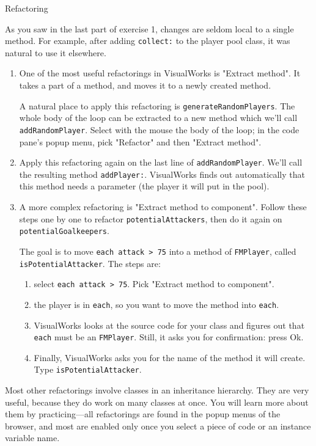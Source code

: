 \documentclass[a4paper,10pt]{scrartcl}
\begin{document}
\begin{exercise}{Refactoring}

As you saw in the last part of exercise 1, changes are seldom local
to a single method.  For example, after adding \verb!collect:! to the
player pool class, it was natural to use it elsewhere.

\begin{enumerate}
\item One of the most useful refactorings in VisualWorks is "Extract
  method".  It takes a part of a method, and moves it to a newly created
  method.

  A natural place to apply this refactoring is \verb!generateRandomPlayers!.
  The whole body of the loop can be extracted to a new method which we'll
  call \verb!addRandomPlayer!.  Select with the mouse the body of the loop;
  in the code pane's popup menu, pick "Refactor" and then "Extract method".

\item Apply this refactoring again on the last line of
  \verb!addRandomPlayer!.  We'll call the resulting method \verb!addPlayer:!.
  VisualWorks finds out automatically that this method needs a parameter (the
  player it will put in the pool).

\item A more complex refactoring is "Extract method to component".  Follow
  these steps one by one to refactor \verb!potentialAttackers!, then do it
  again on \verb!potentialGoalkeepers!.

  The goal is to move \verb!each attack > 75! into a method of \verb!FMPlayer!,
  called \verb!isPotentialAttacker!.  The steps are:
  \begin{enumerate}
  \item select \verb!each attack > 75!.  Pick "Extract method to component".
  \item the player is in \verb!each!, so you want to move the method into
    \verb!each!.
  \item VisualWorks looks at the source code for your class and figures out
    that \verb!each! must be an \verb!FMPlayer!.  Still, it asks you for
    confirmation: press Ok.
  \item Finally, VisualWorks asks you for the name of the method it will
    create.  Type \verb!isPotentialAttacker!.
  \end{enumerate}

\end{enumerate}

Most other refactorings involve classes in an inheritance hierarchy.  They
are very useful, because they do work on many classes at once.  You will
learn more about them by practicing---all refactorings are found in the
popup menus of the browser, and most are enabled only once you select a
piece of code or an instance variable name.

\end{exercise}
\end{document}
